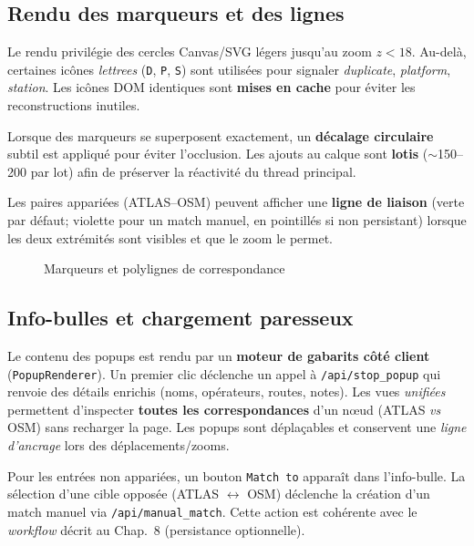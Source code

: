 \subsection{Rendu des marqueurs et des lignes}
Le rendu privilégie des cercles Canvas/SVG légers jusqu'au zoom \(z<18\). Au-delà, certaines icônes \textit{lettrees} (\texttt{D}, \texttt{P}, \texttt{S}) sont utilisées pour signaler \textit{duplicate}, \textit{platform}, \textit{station}. Les icônes DOM identiques sont \textbf{mises en cache} pour éviter les reconstructions inutiles.

Lorsque des marqueurs se superposent exactement, un \textbf{décalage circulaire} subtil est appliqué pour éviter l'occlusion. Les ajouts au calque sont \textbf{lotis} (\(\sim\)150–200 par lot) afin de préserver la réactivité du thread principal.

Les paires appariées (ATLAS–OSM) peuvent afficher une \textbf{ligne de liaison} (verte par défaut; violette pour un match manuel, en pointillés si non persistant) lorsque les deux extrémités sont visibles et que le zoom le permet.

\begin{figure}[h]
  \centering
  \caption{Marqueurs et polylignes de correspondance}
  \label{fig:frontend-markers-lines}
\end{figure}

\subsection{Info-bulles et chargement paresseux}
Le contenu des popups est rendu par un \textbf{moteur de gabarits côté client} (\texttt{PopupRenderer}). Un premier clic déclenche un appel à \texttt{/api/stop\_popup} qui renvoie des détails enrichis (noms, opérateurs, routes, notes). Les vues \textit{unifiées} permettent d'inspecter \textbf{toutes les correspondances} d'un nœud (ATLAS \emph{vs} OSM) sans recharger la page. Les popups sont déplaçables et conservent une \textit{ligne d'ancrage} lors des déplacements/zooms.

Pour les entrées non appariées, un bouton \texttt{Match to} apparaît dans l'info-bulle. La sélection d'une cible opposée (ATLAS \(\leftrightarrow\) OSM) déclenche la création d'un match manuel via \texttt{/api/manual\_match}. Cette action est cohérente avec le \textit{workflow} décrit au Chap.~8 (persistance optionnelle).

